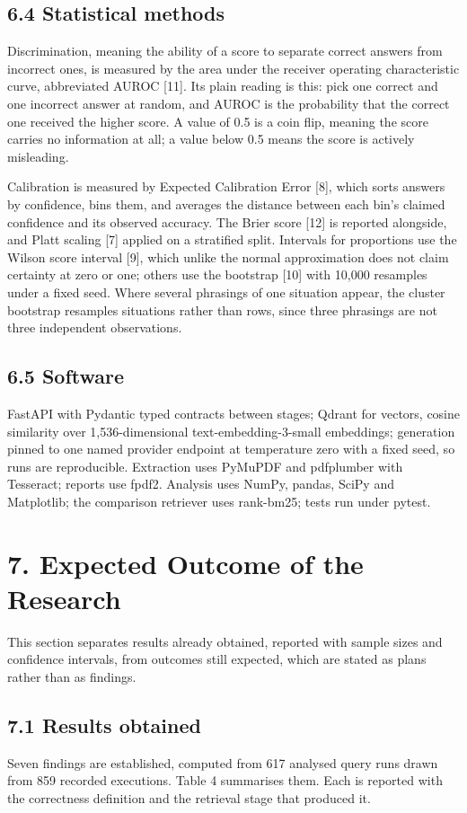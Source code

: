 \documentclass[12pt,a4paper]{article}
\begin{document}
\subsection*{6.4 Statistical methods}
Discrimination, meaning the ability of a score to separate correct answers from incorrect ones, is measured by the area under the receiver operating characteristic curve, abbreviated AUROC [11]. Its plain reading is this: pick one correct and one incorrect answer at random, and AUROC is the probability that the correct one received the higher score. A value of 0.5 is a coin flip, meaning the score carries no information at all; a value below 0.5 means the score is actively misleading.

Calibration is measured by Expected Calibration Error [8], which sorts answers by confidence, bins them, and averages the distance between each bin's claimed confidence and its observed accuracy. The Brier score [12] is reported alongside, and Platt scaling [7] applied on a stratified split. Intervals for proportions use the Wilson score interval [9], which unlike the normal approximation does not claim certainty at zero or one; others use the bootstrap [10] with 10,000 resamples under a fixed seed. Where several phrasings of one situation appear, the cluster bootstrap resamples situations rather than rows, since three phrasings are not three independent observations.

\subsection*{6.5 Software}
FastAPI with Pydantic typed contracts between stages; Qdrant for vectors, cosine similarity over 1,536-dimensional text-embedding-3-small embeddings; generation pinned to one named provider endpoint at temperature zero with a fixed seed, so runs are reproducible. Extraction uses PyMuPDF and pdfplumber with Tesseract; reports use fpdf2. Analysis uses NumPy, pandas, SciPy and Matplotlib; the comparison retriever uses rank-bm25; tests run under pytest.

\section*{7. Expected Outcome of the Research}
This section separates results already obtained, reported with sample sizes and confidence intervals, from outcomes still expected, which are stated as plans rather than as findings.

\subsection*{7.1 Results obtained}
Seven findings are established, computed from 617 analysed query runs drawn from 859 recorded executions. Table 4 summarises them. Each is reported with the correctness definition and the retrieval stage that produced it.
\end{document}

